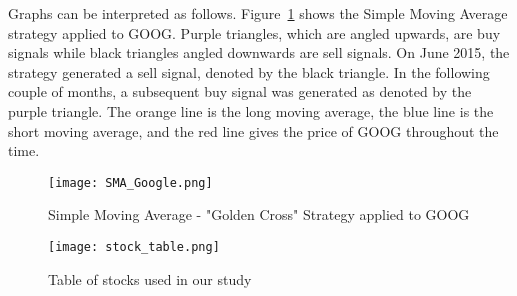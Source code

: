 \documentclass[../thesis.tex]{subfiles}
\begin{document}
Graphs can be interpreted as follows. Figure~\ref{SMAfigure} shows the Simple Moving Average strategy applied to GOOG. Purple triangles, which are angled upwards, are buy signals while black triangles angled downwards are sell signals. On June 2015, the strategy generated a sell signal, denoted by the black triangle. In the following couple of months, a subsequent buy signal was generated as denoted by the purple triangle. The orange line is the long moving average, the blue line is the short moving average, and the red line gives the price of GOOG throughout the time. 

\begin{figure}[h]
\centering
\texttt{[image: SMA\_Google.png]}
\caption{Simple Moving Average - "Golden Cross" Strategy applied to GOOG \label{overflow}}
\label{SMAfigure}
\end{figure}

\begin{figure}[h]
\centering
\texttt{[image: stock\_table.png]}
\caption{Table of stocks used in our study \label{overflow}}
\label{stocktable}
\end{figure}
\end{document}

